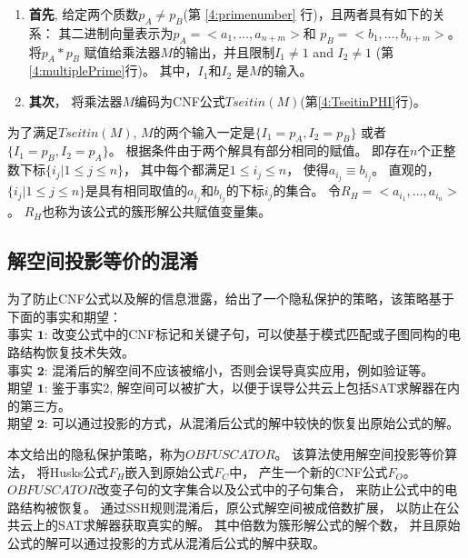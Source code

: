 \begin{enumerate}
\item \textbf{首先},
给定两个质数$p_A \neq p_B$(第 \ref{4:primenumber} 行)，且两者具有如下的关系：
其二进制向量表示为$p_A=<a_1,\dots,a_{n+m}>$和
$p_B=<b_1,\dots,b_{n+m}>$。
将$p_A * p_B$ 赋值给乘法器$M$的输出，并且限制$I_1\ne 1$ and  $I_2\ne 1$ (第\ref{4:multiplePrime}行)。
其中，$I_1$和$I_2$ 是$M$的输入。

\item \textbf{其次}，
将乘法器$M$编码为CNF公式$Tseitin(M)$(第\ref{4:TseitinPHI}行)。
\end{enumerate}

为了满足$Tseitin(M)$,
$M$的两个输入一定是$\{I_1=p_A,I_2=p_B\}$ 或者 $\{I_1=p_B,I_2=p_A\}$。
根据条件由于两个解具有部分相同的赋值。
即存在$n$个正整数下标$\{i_j|1\le j\le n\}$，
其中每个都满足$1\le i_j\le n$，
使得$a_{i_j}\equiv b_{i_j}$。
直观的，
$\{i_j|1\le j\le n\}$是具有相同取值的$a_{i_j}$和$b_{i_j}$的下标$i_j$的集合。
令$R_H=<a_{i_1},\dots,a_{i_n}>$。
$R_H$也称为该公式的簇形解公共赋值变量集。



\subsection{解空间投影等价的混淆}\label{4:obfuscating}

为了防止CNF公式以及解的信息泄露，给出了一个隐私保护的策略，该策略基于下面的事实和期望：
\\$\textbf{事实 1:}$ 改变公式中的CNF标记和关键子句，可以使基于模式匹配或子图同构的电路结构恢复技术失效。
\\$\textbf{事实 2:}$ 混淆后的解空间不应该被缩小，否则会误导真实应用，例如验证等。
\\$\textbf{期望 1:}$ 鉴于事实2, 解空间可以被扩大，以便于误导公共云上包括SAT求解器在内的第三方。
\\$\textbf{期望 2:}$ 可以通过投影的方式，从混淆后公式的解中较快的恢复出原始公式的解。

本文给出的隐私保护策略，称为$OBFUSCATOR$。
该算法使用解空间投影等价算法，
将Husks公式$F_H$嵌入到原始公式$F_C$中，
产生一个新的CNF公式$F_O$。
$OBFUSCATOR$改变子句的文字集合以及公式中的子句集合，
来防止公式中的电路结构被恢复。
通过SSH规则混淆后，原公式解空间被成倍数扩展，
以防止在公共云上的SAT求解器获取真实的解。
其中倍数为簇形解公式的解个数，
并且原始公式的解可以通过投影的方式从混淆后公式的解中获取。

